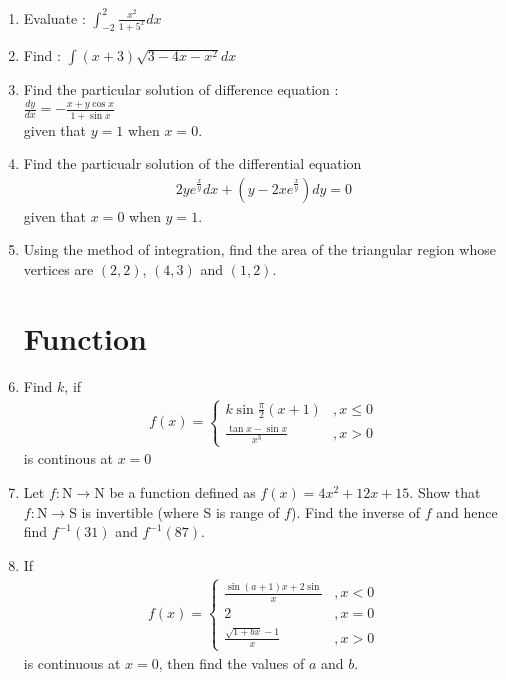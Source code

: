 \documentclass[12pt,-letter paper]{article}
\begin{document}
\begin{enumerate}
	\item Evaluate : $\int_{-2}^{2} \frac{x^2}{1+5^x} dx$

	\item Find : $\int (x+3)\sqrt{3 - 4x - x^2} dx$\\

	\item Find the particular solution of difference equation :\\
 $\frac{dy}{dx} = - \frac{x + y\cos x}{1 + \sin x}$ \\
 given that $y = 1$ when $x = 0$.

	\item Find the particualr solution of the differential equation
	\begin{align*}
		2y e^{\frac{x}{y}} dx + (y -2x e^{\frac{x}{y}}) dy = 0
	\end{align*}
given that $x = 0$ when $y = 1$.

	\item Using the method of integration, find the area of the triangular region whose vertices are $(2, 2)$, $(4, 3)$ and $(1, 2)$.


\section{Function}
	\item Find $k$, if 
	\begin{align*}
		f(x) = \begin{cases} k\sin \frac{\pi}{2}(x+1) &,x \leq 0\\
		\frac{\tan x - \sin x}{x^3} &, x>0
		\end{cases}
	\end{align*}
is continous at $x=0$
	
	\item Let $f: \text{N} \rightarrow \text{N}$ be a function defined as 
	$f(x) = 4x^2 + 12x + 15.$
Show that $f: \text{N} \rightarrow \text{S}$ is invertible (where S is range of $f$).
Find the inverse of $f$ and hence find $f^{-1}(31)$ and $f^{-1}(87)$.


	\item If 
	\begin{align*}
		f(x) = 
		\begin{cases}
			\frac{\sin(a+1)x + 2\sin}{x} &,x<0 \\
			2 &,x = 0\\
			\frac{\sqrt{1+bx}-1}{x} &,x>0
		\end{cases}
	\end{align*}
is continuous at $x = 0$, then find the values of $a$ and $b$.


\end{enumerate}
\end{document}
